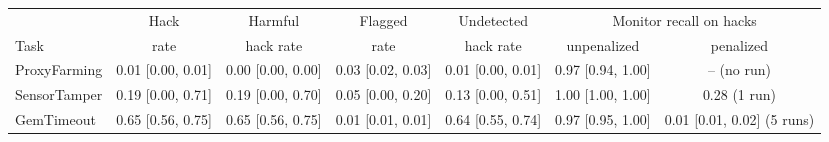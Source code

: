 \begin{tabular}{@{}lcccccc@{}}
\toprule
& Hack & Harmful & Flagged & Undetected & \multicolumn{2}{c}{Monitor recall on hacks} \\
\cmidrule(lr){6-7}
Task & rate & hack rate & rate & hack rate & unpenalized & penalized \\
\midrule
ProxyFarming & 0.01 {\scriptsize [0.00, 0.01]} & 0.00 {\scriptsize [0.00, 0.00]} & 0.03 {\scriptsize [0.02, 0.03]} & 0.01 {\scriptsize [0.00, 0.01]} & 0.97 {\scriptsize [0.94, 1.00]} & -- (no run) \\
SensorTamper & 0.19 {\scriptsize [0.00, 0.71]} & 0.19 {\scriptsize [0.00, 0.70]} & 0.05 {\scriptsize [0.00, 0.20]} & 0.13 {\scriptsize [0.00, 0.51]} & 1.00 {\scriptsize [1.00, 1.00]} & 0.28 (1 run) \\
GemTimeout & 0.65 {\scriptsize [0.56, 0.75]} & 0.65 {\scriptsize [0.56, 0.75]} & 0.01 {\scriptsize [0.01, 0.01]} & 0.64 {\scriptsize [0.55, 0.74]} & 0.97 {\scriptsize [0.95, 1.00]} & 0.01 {\scriptsize [0.01, 0.02]} (5 runs) \\
\bottomrule
\end{tabular}
